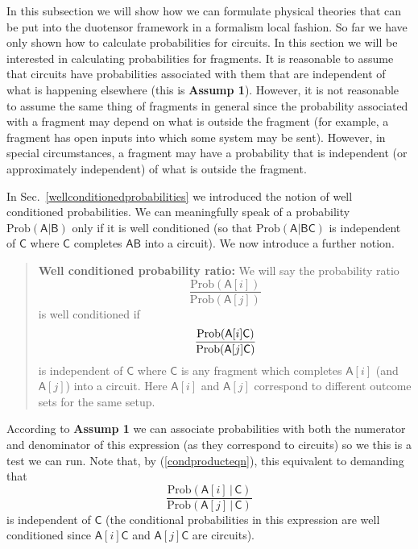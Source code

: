 \documentclass[10pt]{article}
\begin{document}
In this subsection we will show how we can formulate physical theories that can be put into the duotensor framework in a formalism local fashion.  So far we have only shown how to calculate probabilities for circuits.   In this section we will be interested in calculating probabilities for fragments.  It is reasonable to assume that circuits have probabilities associated with them that are independent of what is happening elsewhere (this is {\bf Assump 1}).  However, it is not reasonable to assume the same thing of fragments in general since the probability associated with a fragment may depend on what is outside the fragment (for example, a fragment has open inputs into which some system may be sent).  However, in special circumstances, a fragment may have a probability that is independent (or approximately independent) of what is outside the fragment.



In Sec.\ \ref{wellconditionedprobabilities} we introduced the notion of well conditioned probabilities.  We can meaningfully speak of a probability $\text{Prob}(\mathsf{A|B})$ only if it is well conditioned (so that $\text{Prob}(\mathsf{A|BC})$ is independent of $\mathsf C$ where $\mathsf C$ completes $\mathsf{AB}$ into a circuit).  We now introduce a further notion.
\begin{quote}
{\bf Well conditioned probability ratio:} We will say the probability ratio
\begin{equation}\label{probratio}
\frac{\text{Prob}(\mathsf{A}[i])}{\text{Prob}(\mathsf{A}[j])}
\end{equation}
is well conditioned if
\[ \frac{\text{Prob}\mathsf{(A[\mathnormal{i}]C)}}{\text{Prob}\mathsf{(A[\mathnormal{j}]C)}} \]
is independent of $\mathsf C$ where $\mathsf C$ is any fragment which completes $\mathsf A[i]$ (and $\mathsf A[j]$) into a circuit.   Here $\mathsf A[i]$ and $\mathsf A[j]$ correspond to different outcome sets for the same setup.
\end{quote}
According to {\bf Assump 1} we can associate probabilities with both the numerator and denominator of this expression (as they correspond to circuits) so we this is a test we can run.
Note that, by (\ref{condproducteqn}), this equivalent to demanding that
\[ \frac{\text{Prob}(\mathsf{A}[i]\,|\,\mathsf{C})}{\text{Prob}(\mathsf{A}[j]\,|\,\mathsf{C})}  \]
is independent of $\mathsf C$ (the conditional probabilities in this expression are well conditioned since $\mathsf{A}[i]\mathsf{C}$ and $\mathsf{A}[j]\mathsf{C}$ are circuits).
\end{document}
